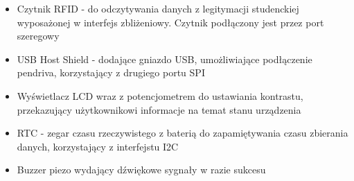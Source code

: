 \documentclass[declaration,shortabstract, mgr]{iithesis}
\begin{document}
\begin{itemize}
\item Czytnik RFID - do odczytywania danych z legitymacji studenckiej wyposażonej w interfejs zbliżeniowy. Czytnik podłączony jest przez port szeregowy
\item USB Host Shield - dodające gniazdo USB, umożliwiające podłączenie pendriva, korzystający z drugiego portu SPI
\item Wyświetlacz LCD wraz z potencjometrem do ustawiania kontrastu, przekazujący użytkownikowi informacje na temat stanu urządzenia
\item RTC - zegar czasu rzeczywistego z baterią do zapamiętywania czasu zbierania danych, korzystający z interfejstu I2C
\item Buzzer piezo wydający dźwiękowe sygnały w razie sukcesu
\end{itemize}
\end{document}
